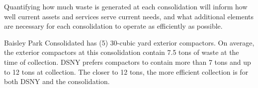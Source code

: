 
    Quantifying how much waste is generated at each consolidation will inform how well current assets and services serve current needs, and what additional elements are necessary for each consolidation to operate as efficiently as possible.
    
    Baisley Park Consolidated has (5) 30-cubic yard exterior compactors. On average, the exterior compactors at this consolidation contain 7.5 tons of waste at the time of collection. DSNY prefers compactors to contain more than 7 tons and up to 12 tons at collection. The closer to 12 tons, the more efficient collection is for both DSNY and the consolidation.